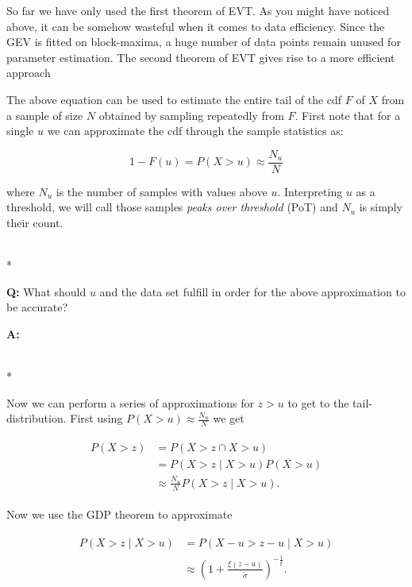 So far we have only used the first theorem of EVT. As you might have noticed
above, it can be somehow wasteful when it comes to data efficiency. Since the
GEV is fitted on block-maxima, a huge number of data points remain unused for
parameter estimation. The second theorem of EVT gives rise to a more efficient
approach

The above equation can be used to estimate the entire tail of the cdf $F$ of $X$
from a sample of size $N$ obtained by sampling repeatedly from $F$. First note
that for a single $u$ we can approximate the cdf through the sample statistics
as:


\begin{equation}
1-F(u) = P(X>u) \approx \frac{N_u}{N}
\end{equation}


where $N_u$ is the number of samples with values above $u$. Interpreting $u$ as
a threshold, we will call those samples \textit{peaks over threshold} (PoT) and
$N_u$ is simply their count.

\hrulefill\\*

\textbf{Q:} What should $u$ and the data set fulfill in order for the above
approximation to be accurate?

\textbf{A:} 

\hrulefill\\*

Now we can perform a series of approximations for $z>u$ to get to the
tail-distribution. First using $P(X>u) \approx \frac{N_u}{N}$ we get


\begin{align}
    \begin{split}
        P(X>z) &= P(X>z \cap X>u)  \\
        &= P(X>z \mid X>u) P(X>u)  \\
        &\approx \frac{N_u}{N} P(X>z \mid X>u).   
    \end{split}
\end{align}


Now we use the GDP theorem to approximate


\begin{align}
    \begin{split}
        P(X>z \mid X>u) &= P(X-u > z -u \mid X>u)  \\ 
        &\approx \left( 1 + \frac{\xi (z-u)}{\tilde{\sigma}} \right)^{-\frac{1}{\xi}}.
    \end{split}
\end{align}


